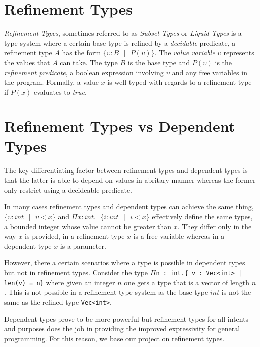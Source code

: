 \documentclass[a4paper,12pt]{report}
\begin{document}
\section{Refinement Types}
\textit{Refinement Types}, sometimes referred to as \textit{Subset Types} 
\cite{subsetTypes} or \textit{Liquid Types} \cite{liquidTypes} 
is a type system where a certain base type is refined by a 
\textit{decidable} predicate, a refinement type $A$ has the form 
$\{\upsilon : B\text{ }|\text{ }P(\upsilon)\}$. The \textit{value variable} 
$\upsilon$ represents the values that $A$ can take. The type $B$ is the 
base type and $P(\upsilon)$ is the \textit{refinement predicate}, 
a boolean expression involving $\upsilon$ and any free variables in the program. 
Formally, a value $x$ is well typed with regards to a refinement type 
if $P(x)$ evaluates to \textit{true}.

\section{Refinement Types vs Dependent Types}
The key differentiating factor between refinement types and dependent types is 
that the latter is able to depend on values in abritary manner whereas 
the former only restrict using a decideable predicate. 

\par
In many cases refinement types and dependent types can achieve the same thing, 
$\{\upsilon : int \text{ }|\text{ }\upsilon < x\}$ and 
$\Pi x:int.\text{ }\{ i:int\text{ }|\text{ }i < x\}$ effectively define the 
same types, a bounded integer whose value cannot be greater than $x$. They differ 
only in the way $x$ is provided, in a refinement type $x$ is a free variable 
whereas in a dependent type $x$ is a parameter. 

\par
However, there a certain scenarios where a type is possible in dependent types 
but not in refinement types. Consider the type $\Pi$\verb+n : int.{ v : Vec<int> | len(v) = n}+
where given an integer $n$ one gets a type that is a vector of length $n$. This 
is not possible in a refinement type system as the base type $int$ is not 
the same as the refined type \verb|Vec<int>|.

\par
Dependent types prove to be more powerful but 
refinement types for all intents and purposes does the job in 
providing the improved expressivity for general programming. For this reason, we 
base our project on refinement types. 
\end{document}
